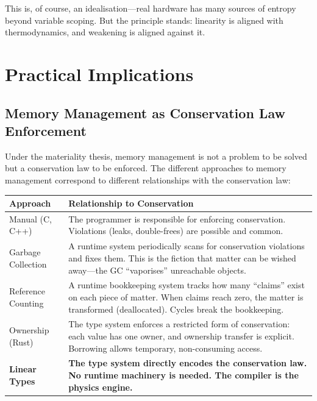 \documentclass[11pt,a4paper]{article}
\begin{document}
This is, of course, an idealisation---real hardware has many sources
of entropy beyond variable scoping. But the principle stands:
linearity is aligned with thermodynamics, and weakening is aligned
against it.


\section{Practical Implications}
\label{sec:practical}

\subsection{Memory Management as Conservation Law Enforcement}

Under the materiality thesis, memory management is not a problem to
be solved but a conservation law to be enforced. The different
approaches to memory management correspond to different relationships
with the conservation law:

\begin{center}
\begin{tabular}{@{}lp{8cm}@{}}
\toprule
\textbf{Approach} & \textbf{Relationship to Conservation} \\
\midrule
Manual (C, C++) &
  The programmer is responsible for enforcing conservation.
  Violations (leaks, double-frees) are possible and common. \\
Garbage Collection &
  A runtime system periodically scans for conservation violations
  and fixes them. This is the fiction that matter can be wished
  away---the GC ``vaporises'' unreachable objects. \\
Reference Counting &
  A runtime bookkeeping system tracks how many ``claims'' exist on
  each piece of matter. When claims reach zero, the matter is
  transformed (deallocated). Cycles break the bookkeeping. \\
Ownership (Rust) &
  The type system enforces a restricted form of conservation:
  each value has one owner, and ownership transfer is explicit.
  Borrowing allows temporary, non-consuming access. \\
\textbf{Linear Types} &
  \textbf{The type system directly encodes the conservation law.
  No runtime machinery is needed. The compiler is the physics
  engine.} \\
\bottomrule
\end{tabular}
\end{center}
\end{document}
